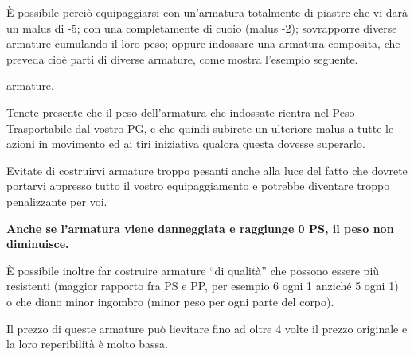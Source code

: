 \`E possibile perci\`o equipaggiarsi con un'armatura totalmente di
piastre che vi dar\`a un malus di -5; con una completamente di cuoio (malus
-2); sovrapporre diverse armature cumulando il loro peso; oppure indossare una
armatura composita, che preveda cio\`e parti di diverse 
\iffullversion armature, come mostra
l'esempio seguente.

\else
armature.
\fi

Tenete presente che il peso dell'armatura che indossate rientra nel
Peso Trasportabile dal vostro PG, e che quindi subirete un ulteriore
malus a tutte le azioni in movimento ed ai tiri iniziativa qualora
questa dovesse superarlo.

Evitate di costruirvi armature troppo pesanti anche alla luce del
fatto che dovrete portarvi appresso tutto il vostro equipaggiamento e
potrebbe diventare troppo penalizzante per voi. 

\textbf{Anche se l'armatura viene danneggiata e raggiunge 0 PS, il peso non
diminuisce.}

\iffullversion
\`E possibile inoltre far costruire armature ``di
qualit\`a'' che possono essere pi\`u resistenti (maggior rapporto
fra PS e PP, per esempio 6 ogni 1 anzich\'e 5 ogni 1) o che diano
minor ingombro (minor peso per ogni parte del corpo). 

Il prezzo di
queste armature pu\`o lievitare fino ad oltre 4 volte il prezzo
originale e la loro reperibilit\`a \`e molto bassa. 

